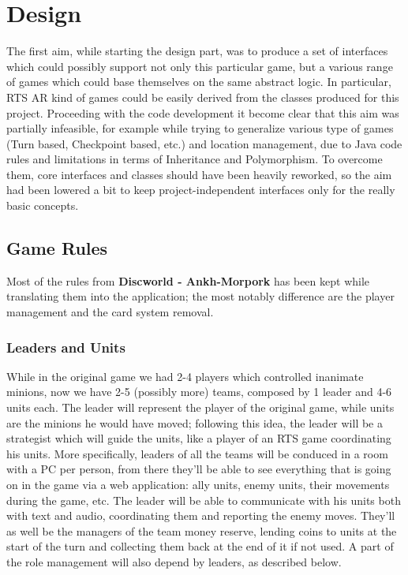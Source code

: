 \chapter{Design}

	The first aim, while starting the design part, was to produce a set of interfaces which could possibly support not only this particular game, but a various range of games which could base themselves on the same abstract logic.
	In particular, RTS AR kind of games could be easily derived from the classes produced for this project.
	Proceeding with the code development it become clear that this aim was partially infeasible, for example while trying to generalize various type of games (Turn based, Checkpoint based, etc.) and location management, due to Java code rules and limitations in terms of Inheritance and Polymorphism.
	To overcome them, core interfaces and classes should have been heavily reworked, so the aim had been lowered a bit to keep project-independent interfaces only for the really basic concepts.

	\section{Game Rules}
		
		Most of the rules from \textbf{Discworld - Ankh-Morpork} has been kept while translating them into the application; the most notably difference are the player management and the card system removal.
		
		\subsection{Leaders and Units}
		
			While in the original game we had 2-4 players which controlled inanimate minions, now we have 2-5 (possibly more) teams, composed by 1 leader and 4-6 units each.
			The leader will represent the player of the original game, while units are the minions he would have moved; following this idea, the leader will be a strategist which will guide the units, like a player of an RTS game coordinating his units.
			More specifically, leaders of all the teams will be conduced in a room with a PC per person, from there they'll be able to see everything that is going on in the game via a web application: ally units, enemy units, their movements during the game, etc.
			The leader will be able to communicate with his units both with text and audio, coordinating them and reporting the enemy moves.
			They'll as well be the managers of the team money reserve, lending coins to units at the start of the turn and collecting them back at the end of it if not used.
			A part of the role management will also depend by leaders, as described below.
		
